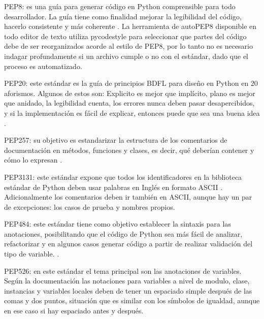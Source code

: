 \begin{APAitemize}
    \item PEP8: es una guía para generar código en Python comprensible para todo desarrollador. La guía tiene como finalidad mejorar la legibilidad del código, hacerlo consistente y más coherente \parencite{PEP8Python}. La herramienta de autoPEP8 disponible en todo editor de texto utiliza pycodestyle para seleccionar que partes del código debe de ser reorganizados acorde al estilo de PEP8, por lo tanto no es necesario indagar profundamente si un archivo cumple o no con el estándar, dado que el proceso es automatizado. 
    \item PEP20: este estándar es la guía de principios BDFL para diseño en Python en 20 aforismos. Algunos de estos son: Explicito es mejor que implícito, plano es mejor que anidado, la legibilidad cuenta, los errores nunca deben pasar desapercibidos, y si la implementación es fácil de explicar, entonces puede que sea una buena idea \parencite{PEP20Python}. 
    \item PEP257: su objetivo es estandarizar la estructura de los comentarios de documentación en métodos, funciones y clases, es decir, qué deberían contener y cómo lo expresan \parencite{PEP257Python}.
    \item PEP3131: este estándar expone que todos los identificadores en la biblioteca estándar de Python deben usar palabras en Inglés en formato ASCII \parencite{PEP3131Python}. Adicionalmente los comentarios deben ir también en ASCII, aunque hay un par de excepciones: los casos de prueba y nombres propios.
    \item PEP484: este estándar tiene como objetivo establecer la sintaxis para las anotaciones, posibilitando que el código de Python sea más fácil de analizar, refactorizar y en algunos casos generar código a partir de realizar validación del tipo de variable. \parencite{PEP484Python}.
    \item PEP526: en este estándar el tema principal son las anotaciones de variables. Según la documentación \parencite{PEP526Python} las notaciones para variables a nivel de modulo, clase, instancias y variables locales deben de tener un espaciado simple después de las comas y dos puntos, situación que es similar con los símbolos de igualdad, aunque en ese caso si hay espaciado antes y después. 
\end{APAitemize}

